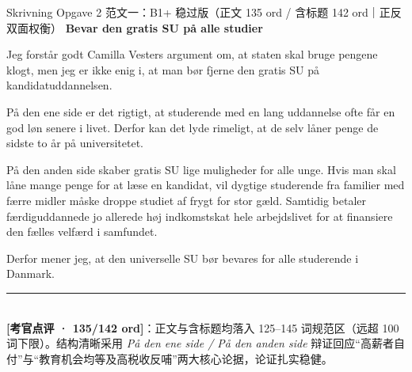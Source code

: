 \begin{emailbox}{Skrivning Opgave 2 范文一：B1+ 稳过版（正文 135 ord / 含标题 142 ord｜正反双面权衡）}
\textbf{\color{NCDNavy}Bevar den gratis SU på alle studier}

\vspace{0.25em}
Jeg forstår godt Camilla Vesters argument om, at staten skal bruge pengene klogt, men jeg er ikke enig i, at man bør fjerne den gratis SU på kandidatuddannelsen.

\vspace{0.25em}
På den ene side er det rigtigt, at studerende med en lang uddannelse ofte får en god løn senere i livet. Derfor kan det lyde rimeligt, at de selv låner penge de sidste to år på universitetet.

\vspace{0.25em}
På den anden side skaber gratis SU lige muligheder for alle unge. Hvis man skal låne mange penge for at læse en kandidat, vil dygtige studerende fra familier med færre midler måske droppe studiet af frygt for stor gæld. Samtidig betaler færdiguddannede jo allerede høj indkomstskat hele arbejdslivet for at finansiere den fælles velfærd i samfundet.

\vspace{0.25em}
Derfor mener jeg, at den universelle SU bør bevares for alle studerende i Danmark.

\vspace{0.3em}
\rule{\linewidth}{0.4pt}\\[0.2em]
\small\textbf{\color{NCDTeal}[考官点评 · 135/142 ord]}：正文与含标题均落入 125--145 词规范区（远超 100 词下限）。结构清晰采用 \textit{På den ene side / På den anden side} 辩证回应“高薪者自付”与“教育机会均等及高税收反哺”两大核心论据，论证扎实稳健。
\end{emailbox}

